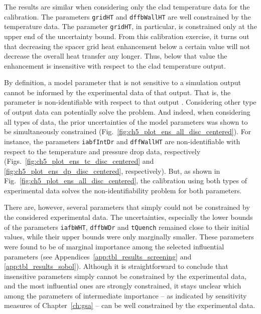 The results are similar when considering only the clad temperature data for the calibration.
The parameters \texttt{gridHT} and \texttt{dffbWallHT} are well constrained by the temperature data.
The parameter \texttt{gridHT}, in particular, is constrained only at the upper end of the uncertainty bound.
From this calibration exercise, it turns out that decreasing the spacer grid heat enhancement below a certain value will not decrease the overall heat transfer any longer.
Thus, below that value the enhancement is insensitive with respect to the clad temperature output.

By definition, a model parameter that is not sensitive to a simulation output cannot be informed by the experimental data of that output. 
That is, the parameter is non-identifiable with respect to that output \cite{Hines2014}.
Considering other type of output data can potentially solve the problem.
And indeed, when considering all types of data, the prior uncertainties of the model parameters was shown to be simultaneously constrained (Fig.~\ref{fig:ch5_plot_ens_all_disc_centered}).
For instance, the parameters \texttt{iabfIntDr} and \texttt{dffWallHT} are non-identifiable with respect to the temperature and pressure drop data, respectively (Figs.~\ref{fig:ch5_plot_ens_tc_disc_centered} and \ref{fig:ch5_plot_ens_dp_disc_centered}, respectively).
But, as shown in Fig.~\ref{fig:ch5_plot_ens_all_disc_centered}, the calibration using both types of experimental data solves the non-identifiability problem for both parameters.

There are, however, several parameters that simply could not be constrained by the considered experimental data.
The uncertainties, especially the lower bounds of the parameters \texttt{iafbWHT}, \texttt{dffbWDr} and \texttt{tQuench} remained close to their initial values,
while their upper bounds were only marginally smaller.
These parameters were found to be of marginal importance among the selected influential parameters (see Appendices~\ref{app:tbl_results_screening} and \ref{app:tbl_results_sobol}).
Although it is straightforward to conclude that insensitive parameters simply cannot be constrained by the experimental data, and the most influential ones are strongly constrained, it stays unclear which among the parameters of intermediate importance -- as indicated by sensitivity measures of Chapter~\ref{ch:gsa} -- can be well constrained by the experimental data.

